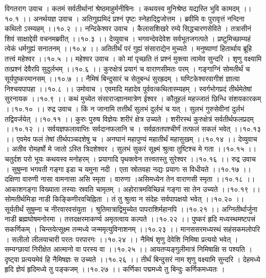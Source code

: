 \documentclass[11pt]{book}
\begin{document}
\begin{landscape}
विगतराग उवाच ।
कतमं सर्वतीर्थानां श्रेष्ठमाहुर्मनीषिनः ।
कथयस्व मुनिश्रेष्ठ यद्यस्ति भुवि कामदम् ।।१०.१ ।।
अनर्थयज्ञ उवाच ।
अतिगुह्यमिदं प्रश्नं पृष्टः स्नेहाद्द्विजोत्तम ।
ब्रवीमि वः पुरावृत्तं नन्दिना कथितो ऽस्म्यहम् ।।१०.२ ।।
नन्दिकेश्वर उवाच ।
कैलासशिखरे रम्ये सिद्धचारणसेविते ।
तत्रासीनं शिवं साक्षाद्देवी वचनमब्रवीत् ।।१०.३ ।।
देव्युवाच ।
भगवन्देवदेवेश सर्वभूतजगत्पते ।
प्रष्टुमिच्छाम्यहं त्वेकं धर्मगुह्यं सनातनम् ।।१०.४ ।।
अतितीर्थं परं गुह्यं संसाराद्येन मुच्यते ।
मनुष्याणां हितार्थाय ब्रूहि तत्त्वं महेश्वर ।।१०.५ ।।
महेश्वर उवाच ।
को मां पृच्छति तं प्रश्नं मुक्त्वा त्वामेव सुन्दरि ।
शृणु वक्ष्यामि तत्प्रश्नं देवैरपि सुदुर्लभम् ।।१०.६ ।।
कुरुक्षेत्रं प्रयागं च वाराणसीमतः परम् ।
गङ्गाग्निं सोमतीर्थं च सूर्यपुष्करमानसम् ।।१०.७ ।।
नैमिषं बिन्दुसारं च सेतुबन्धं सुरह्रदम् ।
घण्टिकेश्वरवागीशं ज्ञात्वा निश्चयपापहा ।।१०.८ ।।
उमोवाच ।
एवमादि महादेव पूर्ववत्कथितास्म्यहम् ।
स्वर्गभोगप्रदं तीर्थमेतेषां सुरनायक ।।१०.९ ।।
कथं मुच्येत संसाराज्ज्ञानमात्रेण ईश्वर ।
कौतूहलं महज्जातं छिन्धि संशयकारकम् ।।१०.१० ।।
रुद्र उवाच ।
किं न जानामि तत्तीर्थं सुलभं दुर्लभं च यत् ।
सुलभं गुरुसेवीनां दुर्लभं तद्विवर्जयेत् ।।१०.११ ।।
कुरुः पुरुष विज्ञेयः शरीरं क्षेत्र उच्यते ।
शरीरस्थं कुरुक्षेत्रं सर्वतीर्थफलप्रदम् ।।१०.१२ ।।
सर्वयज्ञफलावाप्तिः सर्वदानफलानि च ।
सर्वव्रततपश्चीर्णं तत्फलं सकलं भवेत् ।।१०.१३ ।।
एवमेव फलं तेषां तीर्थपञ्चदशेषु च ।
अनघानं महापुण्यं महातीर्थं महासुखम् ।।१०.१४ ।।
देव्युवाच ।
अतीव रोमहर्षो मे जातो ऽस्ति त्रिदशेश्वर ।
सुलभं सुकरं सूक्ष्मं श्रुत्वा तुष्टिश्च मे गता ।।१०.१५ ।।
चतुर्दश परो भूयः कथयस्व मनोहरम् ।
प्रयागादि पृथक्त्वेन तत्त्वतस्तु सुरेश्वर ।।१०.१६ ।।
रुद्र उवाच ।
सुषुम्ना भगवती गङ्गा इडा च यमुना नदी ।
एता स्रोतवहा नद्यः प्रयागः स विधीयते ।।१०.१७ ।।
दक्षिणा वारुणी नासा वामनासा असि स्मृता ।
वारुणा ।असिमध्येन तेन वाराणसी स्मृता ।।१०.१८ ।।
आकाशगङ्गा विख्याता तस्याः स्रवति चामृतम् ।
अहोरात्रमविच्छिन्नं गङ्गा सा तेन उच्यते ।।१०.१९ ।।
सोमतीर्थमिडा नाडी किङ्किणीरवचिह्निता ।
तं तु श्रुत्वा न संदेहः सर्वपापक्षयो भवेत् ।।१०.२० ।।
सूर्यतीर्थं सुषुम्ना च नीरवारवसंयुता ।
श्रुतिमात्राद्विमुच्येत पापराशिर्महानपि ।।१०.२१ ।।
अग्नितीर्थार्जुना नाडी ब्रह्मघोषमनोरमा ।
तत्तदक्षरमाकर्ण्य अमृतत्वाय कल्पते ।।१०.२२ ।।
पुष्करं हृदि मध्यस्थमष्टपत्त्रं सकर्णिकम् ।
चिन्तयेत्सूक्ष्म तन्मध्ये जन्ममृत्युविनाशनम् ।।१०.२३ ।।
मानससरमध्यस्थं सहंसकमलोपरि ।
सलीलो लीलयाचारी परतः परपारगः ।।१०.२४ ।।
नैमिषं शृणु देवेशि निमिषा प्रत्ययो भवेत् ।
सम्यग्छायां निरीक्षेत आत्मानो वा परस्य वा ।।१०.२५ ।।
आयतप्यङ्गुलीमात्रं निमिषाक्षि स पश्यति ।
दृष्ट्वा प्रत्ययमेवं हि नैमिषज्ञः स उच्यते ।।१०.२६ ।।
तीर्थं बिन्दुसरं नाम शृणु वक्ष्यामि सुन्दरि ।
देहमध्ये हृदि ज्ञेयं हृदिमध्ये तु पङ्कजम् ।।१०.२७ ।।
कर्णिका पद्ममध्ये तु बिन्दुः कर्णिकमध्यतः ।

\end{landscape}
\end{document}
